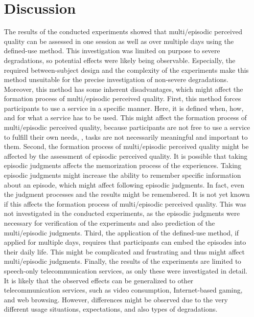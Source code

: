 \section{Discussion}
The results of the conducted experiments showed that multi\-/episodic perceived quality can be assessed in one session as well as over multiple days using the defined-use method.
This investigation was limited on purpose to severe degradations, so potential effects were likely being observable.
Especially, the required between-subject design and the complexity of the experiments make this method unsuitable for the precise investigation of non-severe degradations.
Moreover, this method has some inherent disadvantages, which might affect the formation process of multi\-/episodic perceived quality.
First, this method forces participants to use a service in a specific manner.
Here, it is defined when, how, and for what a service has to be used.
This might affect the formation process of  multi\-/episodic perceived quality, because participants are not free to use a service to fulfill their own needs, \ie, tasks are not necessarily meaningful and important to them.
Second, the formation process of multi\-/episodic perceived quality might be affected by the assessment of episodic perceived quality.
It is possible that taking episodic judgments affects the memorization process of the experiences.
Taking episodic judgments might increase the ability to remember specific information about an episode, which might affect following episodic judgments.
In fact, even the judgment processes and the results might be remembered.
It is not yet known if this affects the formation process of multi\-/episodic perceived quality.
This was not investigated in the conducted experiments, as the episodic judgments were necessary for verification of the experiments and also prediction of the multi\-/episodic judgments.
Third, the application of the defined-use method, if applied for multiple days, requires that participants can embed the episodes into their daily life.
This might be complicated and frustrating and thus might affect multi\-/episodic judgments.
Finally, the results of the experiments are limited to speech-only telecommunication services, as only these were investigated in detail.
It is likely that the observed effects can be generalized to other telecommunication services, such as video consumption, Internet-based gaming, and web browsing.
However, differences might be observed due to the very different usage situations, expectations, and also types of degradations.

